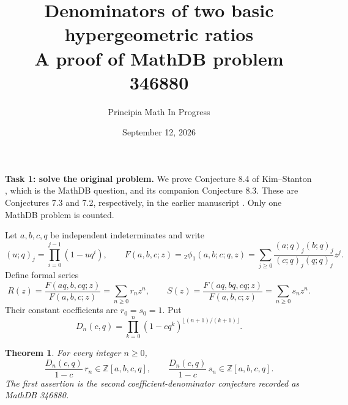 \documentclass[10pt]{article}
\title{Denominators of two basic hypergeometric ratios\\
\large A proof of MathDB problem 346880}
\author{Principia Math In Progress}
\date{September 12, 2026}
\newtheorem{theorem}{Theorem}
\newcommand{\Z}{\mathbb Z}
\begin{document}
\maketitle
\noindent\textbf{Task 1: solve the original problem.}
We prove Conjecture 8.4 of Kim--Stanton \cite{KS}, which is the
MathDB question, and its companion Conjecture 8.3. These are
Conjectures 7.3 and 7.2, respectively, in the earlier manuscript
\cite{original}. Only one MathDB problem is counted.

Let $a,b,c,q$ be independent indeterminates and write
\[
 (u;q)_j=\prod_{i=0}^{j-1}(1-uq^i),\qquad
 F(a,b,c;z)={}_2\phi_1(a,b;c;q,z)
   =\sum_{j\ge0}\frac{(a;q)_j(b;q)_j}{(c;q)_j(q;q)_j}z^j.
\]
Define formal series
\[
 R(z)=\frac{F(aq,b,cq;z)}{F(a,b,c;z)}
       =\sum_{n\ge0}r_nz^n,\qquad
 S(z)=\frac{F(aq,bq,cq;z)}{F(a,b,c;z)}
       =\sum_{n\ge0}s_nz^n .
\]
Their constant coefficients are $r_0=s_0=1$. Put
\[
 D_n(c,q)=\prod_{k=0}^n(1-cq^k)^{\lfloor(n+1)/(k+1)\rfloor}.
\]
\begin{theorem}\label{main}
For every integer $n\ge0$,
\[
 \frac{D_n(c,q)}{1-c}\,r_n\in\Z[a,b,c,q],
 \qquad
 \frac{D_n(c,q)}{1-c}\,s_n\in\Z[a,b,c,q].
                                                               \tag{1}
\]
The first assertion is the second coefficient-denominator conjecture
recorded as MathDB 346880.
\end{theorem}
\end{document}
